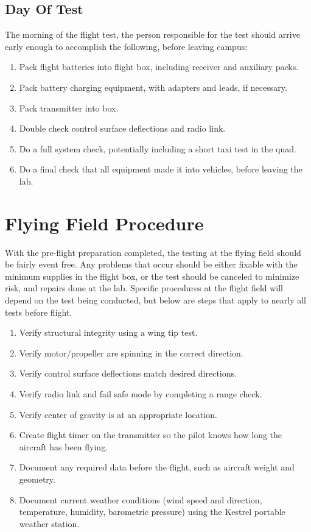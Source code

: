 \subsection{Day Of Test}
The morning of the flight test, the person responsible for the test should arrive early enough to accomplish the following, before leaving campus:
\begin{enumerate}
\item Pack flight batteries into flight box, including receiver and auxiliary packs.
\item Pack battery charging equipment, with adapters and leads, if necessary.
\item Pack transmitter into box.
\item Double check control surface deflections and radio link.
\item Do a full system check, potentially including a short taxi test in the quad.
\item Do a final check that all equipment made it into vehicles, before leaving the lab.
\end{enumerate}

\section{Flying Field Procedure}
With the pre-flight preparation completed, the testing at the flying field should be fairly event free. Any problems that occur should be either fixable with the minimum supplies in the flight box, or the test should be canceled to minimize risk, and repairs done at the lab. Specific procedures at the flight field will depend on the test being conducted, but below are steps that apply to nearly all tests before flight.

\begin{enumerate}
\item Verify structural integrity using a wing tip test.
\item Verify motor/propeller are spinning in the correct direction.
\item Verify control surface deflections match desired directions.
\item Verify radio link and fail safe mode by completing a range check.
\item Verify center of gravity is at an appropriate location.
\item Create flight timer on the transmitter so the pilot knows how long the aircraft has been flying.
\item Document any required data before the flight, such as aircraft weight and geometry.
\item Document current weather conditions (wind speed and direction, temperature, humidity, barometric pressure) using the Kestrel portable weather station.
\end{enumerate}

